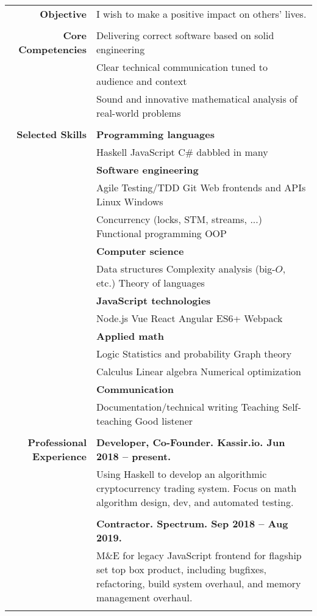 \documentclass{article}
\newcommand\spc{\hspace{8pt}}
\begin{document}
\bgroup
\begin{tabular}{rl}
  \def\arraystrech{1.5}
  {\bf Objective} & I wish to make a positive impact on others' lives. \\ \\
  {\bf Core Competencies} & Delivering correct software based on solid engineering \\
   & Clear technical communication tuned to audience and context \\
  & Sound and innovative mathematical analysis of real-world problems \\ \\

  {\bf Selected Skills}  & {\bf Programming languages} \\
  & Haskell \spc JavaScript \spc C\# \spc dabbled in many \\
  & {\bf Software engineering} \\
  & Agile \spc Testing/TDD \spc Git \spc Web frontends and APIs \spc Linux \spc Windows \\
  & Concurrency (locks, STM, streams, ...) \spc Functional programming \spc OOP \\
  & {\bf Computer science} \\
  & Data structures \spc Complexity analysis (big-$O$, etc.) \spc Theory of languages \\
  & {\bf JavaScript technologies} \\
  & Node.js \spc Vue \spc React \spc Angular \spc ES6+ \spc Webpack \\
  & {\bf Applied math} \\
  & Logic \spc Statistics and probability \spc Graph theory \\
  & Calculus \spc Linear algebra \spc Numerical optimization \\
  & {\bf Communication} \\
  & Documentation/technical writing \spc Teaching \spc Self-teaching \spc Good listener \\ \\

  {\bf Professional Experience}
  & {\bf Developer, Co-Founder. Kassir.io. Jun 2018 -- present.} \\
  & \parbox{4.5in}{Using Haskell to develop an algorithmic cryptocurrency trading system. Focus on math algorithm design, dev, and automated testing.} \\ \\

  & {\bf Contractor. Spectrum. Sep 2018 -- Aug 2019.} \\
  & \parbox{4.5in}{M\&E for legacy JavaScript frontend for flagship set top box product, including bugfixes, refactoring, build system overhaul, and memory management overhaul.} \\ \\


\end{tabular}
\end{document}
